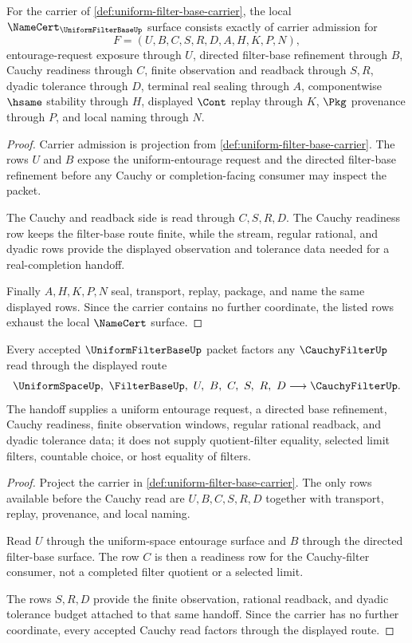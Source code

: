 \begin{theorem}
\label{thm:uniform-filter-base-namecert-obligations}
For the carrier of \autoref{def:uniform-filter-base-carrier}, the local $\NameCert_{\UniformFilterBaseUp}$ surface consists exactly of carrier admission for
$$
F=(U,B,C,S,R,D,A,H,K,P,N),
$$
entourage-request exposure through $U$, directed filter-base refinement through $B$, Cauchy readiness through $C$, finite observation and readback through $S,R$, dyadic tolerance through $D$, terminal real sealing through $A$, componentwise $\hsame$ stability through $H$, displayed $\Cont$ replay through $K$, $\Pkg$ provenance through $P$, and local naming through $N$.
\end{theorem}
\begin{proof}
Carrier admission is projection from \autoref{def:uniform-filter-base-carrier}. The rows $U$ and $B$ expose the uniform-entourage request and the directed filter-base refinement before any Cauchy or completion-facing consumer may inspect the packet.

The Cauchy and readback side is read through $C,S,R,D$. The Cauchy readiness row keeps the filter-base route finite, while the stream, regular rational, and dyadic rows provide the displayed observation and tolerance data needed for a real-completion handoff.

Finally $A,H,K,P,N$ seal, transport, replay, package, and name the same displayed rows. Since the carrier contains no further coordinate, the listed rows exhaust the local $\NameCert$ surface.
\end{proof}

\begin{theorem}
\label{thm:uniform-filter-base-cauchy-handoff}
Every accepted $\UniformFilterBaseUp$ packet factors any $\CauchyFilterUp$ read through the displayed route
$$
\UniformSpaceUp,\ \FilterBaseUp,\ U,\ B,\ C,\ S,\ R,\ D \longrightarrow \CauchyFilterUp .
$$
The handoff supplies a uniform entourage request, a directed base refinement, Cauchy readiness, finite observation windows, regular rational readback, and dyadic tolerance data; it does not supply quotient-filter equality, selected limit filters, countable choice, or host equality of filters.
\end{theorem}
\begin{proof}
Project the carrier in \autoref{def:uniform-filter-base-carrier}. The only rows available before the Cauchy read are $U,B,C,S,R,D$ together with transport, replay, provenance, and local naming.

Read $U$ through the uniform-space entourage surface and $B$ through the directed filter-base surface. The row $C$ is then a readiness row for the Cauchy-filter consumer, not a completed filter quotient or a selected limit.

The rows $S,R,D$ provide the finite observation, rational readback, and dyadic tolerance budget attached to that same handoff. Since the carrier has no further coordinate, every accepted Cauchy read factors through the displayed route.
\end{proof}

